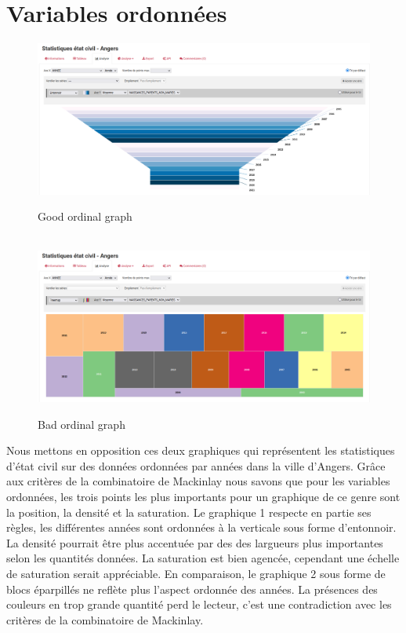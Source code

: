 \documentclass[a4paper,11pt]{article}
\begin{document}
\newpage

\section{Variables ordonnées}

\begin{figure}[h] %
	\centering
	\includegraphics[width=1\linewidth]{ordinal_ok.png} %
	\caption{Good ordinal graph } %
	\label{fig5}\hfil\\ %
	
	
	\includegraphics[width=1\linewidth]{ordinal_no.png} %
	\caption{Bad ordinal graph } %
	\label{fig6} %
\end{figure}

Nous mettons en opposition ces deux graphiques qui représentent les statistiques d'état civil sur des données ordonnées par années dans la ville d'Angers. Grâce aux critères de la combinatoire de Mackinlay nous savons que pour les variables ordonnées, les trois points les plus importants pour un graphique de ce genre sont la position, la densité et la saturation. Le graphique 1 respecte en partie ses règles, les différentes années sont ordonnées à la verticale sous forme d'entonnoir. La densité pourrait être plus accentuée par des des largueurs plus importantes selon les quantités données. La saturation est bien agencée, cependant une échelle de saturation serait appréciable. En comparaison, le graphique 2 sous forme de blocs éparpillés ne reflète plus l'aspect ordonnée des années. La présences des couleurs en trop grande quantité perd le lecteur, c'est une contradiction avec les critères de la combinatoire de Mackinlay.

\newpage
\end{document}
